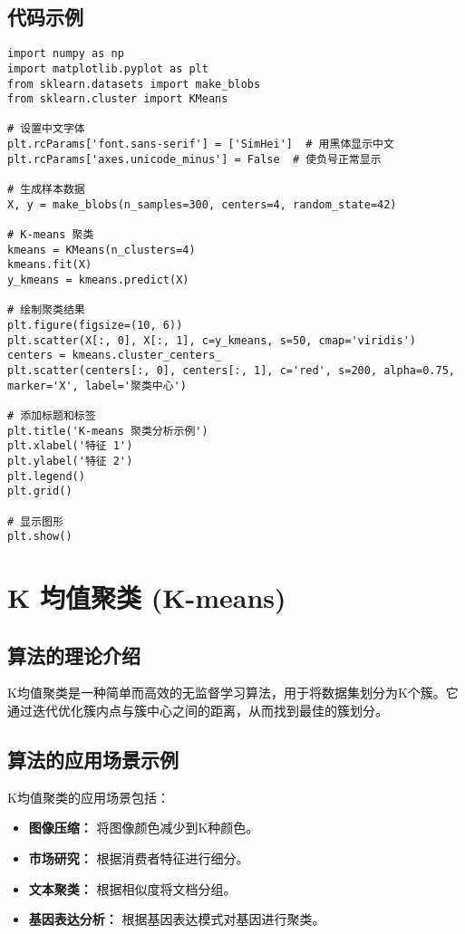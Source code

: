 \subsection*{代码示例}
\begin{lstlisting}
import numpy as np
import matplotlib.pyplot as plt
from sklearn.datasets import make_blobs
from sklearn.cluster import KMeans

# 设置中文字体
plt.rcParams['font.sans-serif'] = ['SimHei']  # 用黑体显示中文
plt.rcParams['axes.unicode_minus'] = False  # 使负号正常显示

# 生成样本数据
X, y = make_blobs(n_samples=300, centers=4, random_state=42)

# K-means 聚类
kmeans = KMeans(n_clusters=4)
kmeans.fit(X)
y_kmeans = kmeans.predict(X)

# 绘制聚类结果
plt.figure(figsize=(10, 6))
plt.scatter(X[:, 0], X[:, 1], c=y_kmeans, s=50, cmap='viridis')
centers = kmeans.cluster_centers_
plt.scatter(centers[:, 0], centers[:, 1], c='red', s=200, alpha=0.75, marker='X', label='聚类中心')

# 添加标题和标签
plt.title('K-means 聚类分析示例')
plt.xlabel('特征 1')
plt.ylabel('特征 2')
plt.legend()
plt.grid()

# 显示图形
plt.show()

\end{lstlisting}


\section{K 均值聚类 (K-means)}
\subsection*{算法的理论介绍}
K均值聚类是一种简单而高效的无监督学习算法，用于将数据集划分为K个簇。它通过迭代优化簇内点与簇中心之间的距离，从而找到最佳的簇划分。

\subsection*{算法的应用场景示例}
K均值聚类的应用场景包括：
\begin{itemize}
    \item \textbf{图像压缩：} 将图像颜色减少到K种颜色。
    \item \textbf{市场研究：} 根据消费者特征进行细分。
    \item \textbf{文本聚类：} 根据相似度将文档分组。
    \item \textbf{基因表达分析：} 根据基因表达模式对基因进行聚类。
\end{itemize}

